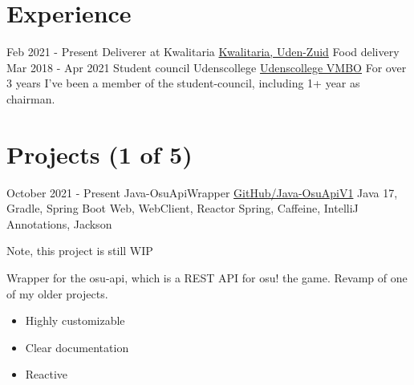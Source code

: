 \documentclass[letterpaper]{twentysecondcv} %
\begin{document}
    \vspace{6mm}




    \section{Experience}
    \begin{twenty} %
        \twentyitem
        {Feb 2021 -}
        {Present}
        {Deliverer at Kwalitaria}
        {\href{https://kwalitaria.nl/uden-zuid/uden-zuid/}{Kwalitaria, Uden-Zuid}}
        {}
        {Food delivery}\\
        \twentyitem
        {Mar 2018 -}
        {Apr 2021}
        {Student council Udenscollege}
        {\href{https://www.udenscollege.nl/vmbo/startpagina-vmbo/}{Udenscollege VMBO}}
        {}
        {
            For over 3 years I've been a member of the student-council, including 1+ year as chairman.
        }
    \end{twenty}

    \vspace{6mm}




    \section{Projects (1 of 5)}
    \begin{twenty} %
        \twentyitem
        {October 2021 -}
        {Present}
        {Java-OsuApiWrapper}
        {\href{https://github.com/Tais993/Java-OsuApiV1/}{GitHub/Java-OsuApiV1}}
        {Java 17, Gradle, Spring Boot Web, WebClient, Reactor Spring, Caffeine, IntelliJ Annotations, Jackson}
        {
        Note, this project is still WIP

        Wrapper for the osu-api, which is a REST API for osu! the game.
        Revamp of one of my older projects.
            \begin{itemize}
                \item Highly customizable
                \item Clear documentation
                \item Reactive
            \end{itemize}}\\
    \end{twenty}
\end{document}
